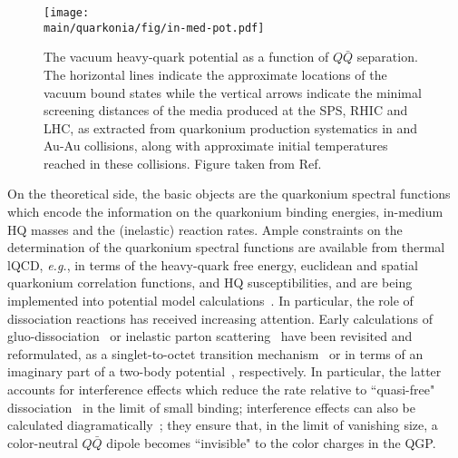 \documentclass[../report.tex]{subfiles}
\providecommand{\main}{..}
\begin{document}
\begin{figure}[!h]
\begin{center}
\texttt{[image: \\main/quarkonia/fig/in-med-pot.pdf]}
\end{center}
\vspace{-0.5cm}
\caption{The vacuum heavy-quark potential as a function of $Q\bar Q$ separation. The horizontal lines indicate the approximate locations of the vacuum bound states while the vertical arrows indicate the minimal screening distances of the media produced at the SPS, RHIC and LHC, as extracted from quarkonium production systematics in \PbPb and Au-Au collisions, along with approximate initial temperatures reached in these collisions. Figure taken from Ref.~\cite{Rapp:2017chc}}
\label{FigQ:pot}
\end{figure}

On the theoretical side, the basic objects are the quarkonium spectral functions which encode the information on the quarkonium binding energies, in-medium HQ masses and the (inelastic) reaction rates.  Ample constraints on the determination of the quarkonium spectral functions are available from thermal lQCD, {\it e.g.}, in terms of the heavy-quark free energy, euclidean and spatial quarkonium correlation functions, and HQ susceptibilities, and are being implemented into potential model calculations~\cite{Wong:2004zr,Mocsy:2005qw,Alberico:2006vw,Brambilla:2008cx,Riek:2010py,Burnier:2015tda,Liu:2017qah}.
In particular, the role of dissociation reactions has received increasing attention. Early calculations of gluo-dissociation~\cite{Bhanot:1979vb,Kharzeev:1994pz} or inelastic parton scattering~\cite{Grandchamp:2001pf} have been revisited and reformulated, \eg as a singlet-to-octet transition mechanism~\cite{Brambilla:2008cx} or in terms of an imaginary part of a two-body potential~\cite{Laine:2006ns}, respectively. In particular, the latter accounts for interference effects which reduce the rate relative to ``quasi-free" dissociation~\cite{Grandchamp:2001pf} in the limit of small binding; interference effects can also be calculated diagramatically~\cite{Park:2007zza}; they ensure that, in the limit of vanishing size, a color-neutral $Q\bar Q$ dipole becomes ``invisible" to the color charges in the QGP.
\end{document}
